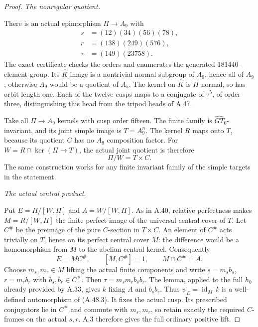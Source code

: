 \begin{proof}
\emph{The nonregular quotient.}\par
There is an actual epimorphism \(\Pi\to A_9\)
with
\[
 \begin{aligned}
 s&=(12)(34)(56)(78),\\
 r&=(138)(249)(576),\\
 \tau&=(149)(23758).
 \end{aligned}
 \tag{A.48.2}
\]
The exact certificate
checks the orders and enumerates the generated
181440-element group. Its \(\widehat K\)
image is a nontrivial normal subgroup of
\(A_9\), hence all of \(A_9\); otherwise
\(A_9\) would be a quotient of \(A_5\).
The kernel on \(\widehat K\) is \(\Pi\)-normal,
so has orbit length one. Each of the twelve
cusps maps to a conjugate of \(\tau^5\),
of order three, distinguishing this head from
the tripod heads of A.47.

Take all \(\Pi\to A_9\) kernels with cusp
order fifteen. The finite family is
\(\widehat{GT}_0\)-invariant, and its joint
simple image is \(T=A_9^n\). The kernel
\(R\) maps onto \(T\), because its quotient
\(C\) has no \(A_9\) composition factor.
For \(W=R\cap\ker(\Pi\to T)\), the actual
joint quotient is therefore
\[
                             \Pi/W=T\times C.
\]
The same construction works for any finite
invariant family of the simple targets in
the statement.

\emph{The actual central product.}\par
Put \(E=\Pi/[W,\Pi]\) and
\(A=W/[W,\Pi]\). As in A.40, relative
perfectness makes
\(M=R/[W,\Pi]\) the finite perfect image
of the universal central cover of \(T\).
Let \(C^\#\) be the preimage of the pure
\(C\)-section in \(T\times C\).
An element of \(C^\#\) acts trivially on
\(T\), hence on its perfect central cover
\(M\): the difference would be a homomorphism
from \(M\) to the abelian central kernel.
Consequently
\[
                 E=MC^\#,
 \qquad [M,C^\#]=1,
 \qquad M\cap C^\#=A.
 \tag{A.48.3}
\]
Choose \(m_s,m_r\in M\) lifting the actual
finite components and write
\(s=m_sb_s\), \(r=m_rb_r\) with
\(b_s,b_r\in C^\#\). Then
\(\tau=m_sm_rb_sb_r\).
The lemma, applied to the full \(h_0\) already
provided by A.33, gives \(k\) fixing
\(A\) and \(b_sb_r\). Thus
\(\psi_E=\operatorname{id}_M\,k\) is a
well-defined automorphism of (A.48.3).
It fixes the actual cusp. Its prescribed
conjugators lie in \(C^\#\) and commute
with \(m_s,m_r\), so retain exactly the
required \(C\)-frames on the actual
\(s,r\). A.3 therefore gives the full
ordinary positive lift.


\end{proof}
